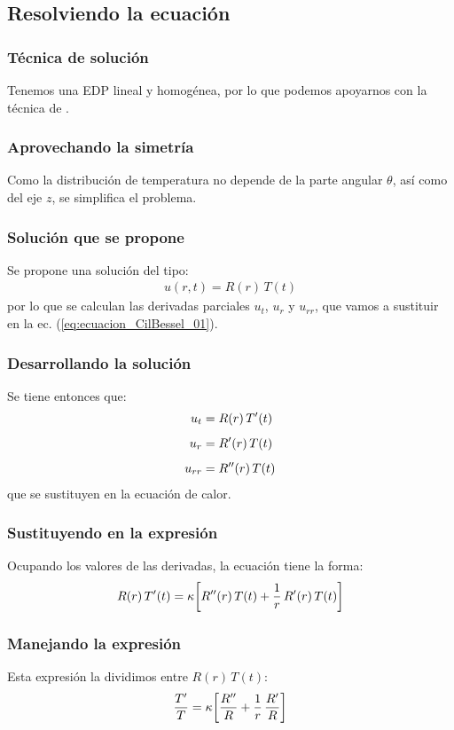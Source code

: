 \documentclass[12pt]{beamer}
\begin{document}
\subsection{Resolviendo la ecuación}

\begin{frame}
\frametitle{Técnica de solución}
Tenemos una EDP lineal y homogénea, por lo que podemos apoyarnos con la técnica de .
\end{frame}
\begin{frame}
\frametitle{Aprovechando la simetría}
Como la distribución de temperatura no depende  de la parte angular $\theta$, así como del eje $z$, se simplifica el problema.
\end{frame}
\begin{frame}
\frametitle{Solución que se propone}
Se propone una solución del tipo:
\pause
\begin{align*}
u (r, t) = R (r) \, T (t)
\end{align*}
por lo que se calculan las derivadas parciales $u_{t}$, $u_{r}$ y $u_{rr}$, que vamos a sustituir en la ec. (\ref{eq:ecuacion_CilBessel_01}).
\end{frame}
\begin{frame}
\frametitle{Desarrollando la solución}
Se tiene entonces que:
\pause
\begin{align*}
u_{t} &= R (r) \, {T}^{\prime} (t) \\[0.5em] 
u_{r} &= {R}^{\prime} (r) \, {T} (t) \\[0.5em] 
u_{rr} &= {R}^{\prime \prime} (r) \, {T} (t)
\end{align*}
que se sustituyen en la ecuación de calor.
\end{frame}
\begin{frame}
\frametitle{Sustituyendo en la expresión}
Ocupando los valores de las derivadas, la ecuación tiene la forma:
\pause
\begin{align*}
R (r) \, {T}^{\prime} (t) = \kappa \bigg[ {R}^{\prime \prime} (r) \, {T} (t) + \dfrac{1}{r} \, {R}^{\prime} (r) \, {T}(t) \bigg]
\end{align*}
\end{frame}
\begin{frame}
\frametitle{Manejando la expresión}
Esta expresión la dividimos entre $R (r) \, T (t)$:
\pause
\begin{align*}
\dfrac{{T}^{\prime}}{T} = \kappa \bigg[ \dfrac{{R}^{\prime \prime}}{R} + \dfrac{1}{r} \, \dfrac{{R}^{\prime}}{R} \bigg]
\end{align*}
\end{frame}
\end{document}
